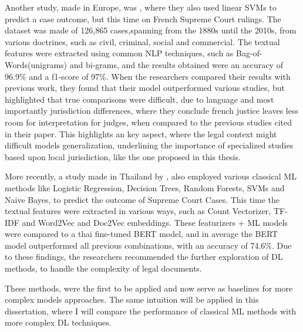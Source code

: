 \documentclass[11pt,a4paper,twoside,openright]{book}
\begin{document}
\par Another study, made in Europe, was \textcite{sulea_predicting_2017}, where they also used linear SVMs to predict a case outcome, but this time on French Supreme Court rulings.
The dataset was made of 126,865 cases,spanning from the 1880s until the 2010s, from various doctrines, such as civil, criminal, social and commercial.
The textual features were extracted using common NLP techniques, such as Bag-of-Words(unigrams) and bi-grams, 
and the results obtained were an accuracy of 96.9\% and a f1-score of 97\%. 
When the researchers compared their results with previous work, they found that their model outperformed various studies, 
but highlighted that true comparisons were difficult, due to language and most importantly jurisdiction differences, where they conclude french justice
leaves less room for interpretation for judges, when compared to the previous studies cited in their paper.
This highlights an key aspect, where the legal context might difficult models generalization, underlining the importance of specialized studies based upon local jurisdiction,
like the one proposed in this thesis.

\par More recently, a study made in Thailand by \textcite{anantathanavit_utilizing_2024}, also employed various classical ML methods 
like Logistic Regression, Decision Trees, Random Forests, SVMs and Naive Bayes, to predict the outcome of Supreme Court Cases. 
This time the textual features were extracted in various ways, such as Count Vectorizer, TF-IDF and Word2Vec and Doc2Vec embeddings. 
These featurizers + ML models were compared to a thai fine-tuned BERT model, and in average the BERT model outperformed all previous combinations, with an accuracy of 74.6\%.
Due to these findings, the researchers recommended the further exploration of DL methods, to handle the complexity of legal documents.

\par These methods, were the first to be applied and now serve as baselines for more complex models approaches. 
The same intuition will be applied in this dissertation, where I will compare the performance of classical ML methods with more complex DL techniques.
\end{document}
